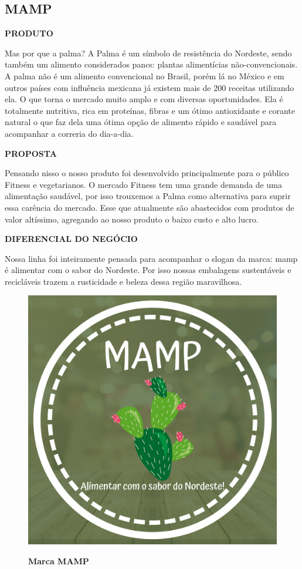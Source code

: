 \subsection{MAMP}

\textbf{PRODUTO}

Mas por que a palma? A Palma é um símbolo de resistência do Nordeste, sendo também um alimento considerados pancs: plantas alimentícias não-convencionais. A palma não é um alimento convencional no Brasil, porém lá no México e em outros países com influência mexicana já existem mais de 200 receitas utilizando ela. O que torna o mercado muito amplo e com diversas oportunidades. Ela é totalmente nutritiva, rica em proteínas, fibras e um ótimo antioxidante e corante natural o que faz dela uma ótima opção de alimento rápido e saudável para acompanhar a correria do dia-a-dia.

\textbf{PROPOSTA}

Pensando nisso o nosso produto foi desenvolvido principalmente para o público Fitness e vegetarianos. O mercado Fitness tem uma grande demanda de uma alimentação saudável, por isso trouxemos a Palma como alternativa para suprir essa carência do mercado. Esse que atualmente são abastecidos com produtos de valor altíssimo, agregando ao nosso produto o baixo custo e alto lucro.

\textbf{DIFERENCIAL DO NEGÓCIO}

Nossa linha foi inteiramente pensada para acompanhar o slogan da marca: mamp é alimentar com o sabor do Nordeste. Por isso nossas embalagens sustentáveis e recicláveis trazem a rusticidade e beleza dessa região maravilhosa.



\begin{figure}[!htb]
\centering
\caption{\textbf{Marca MAMP}}
\includegraphics[scale=0.1]{Imagens/mamp.png}
\label{figura_22}
\end{figure}
\newpage




